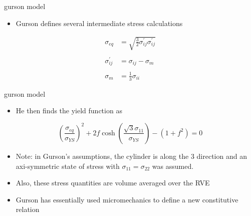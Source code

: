 \documentclass[
  letterpaper,
  ignorenonframetext,
  aspectratio=43,
  handout,
  12pt]{beamer}
\providecommand{\tightlist}{%
  \setlength{\itemsep}{0pt}\setlength{\parskip}{0pt}}
\providecommand{\tightlist}{%
\setlength{\itemsep}{0pt}\setlength{\parskip}{0pt}}
\begin{document}
\begin{frame}{gurson model}
\protect\hypertarget{gurson-model-1}{}
\begin{itemize}
\tightlist
\item
  Gurson defines several intermediate stress calculations
\end{itemize}

\[\begin{aligned}
  \sigma_{eq} &= \sqrt{\frac{3}{2}\sigma_{ij}^\prime\sigma_{ij}^\prime}\\\\
  \sigma_{ij}^\prime &= \sigma_{ij} - \sigma_m\\\\
  \sigma_m &= \frac{1}{3} \sigma_{ii}
\end{aligned}\]
\end{frame}

\begin{frame}{gurson model}
\protect\hypertarget{gurson-model-2}{}
\begin{itemize}
\tightlist
\item
  He then finds the yield function as
\end{itemize}

\[\left(\frac{\sigma_{eq}}{\sigma_{YS}}\right)^2 + 2f\cosh\left( \frac{\sqrt{3}\sigma_{11}}{\sigma_{YS}}\right) - (1+f^2) = 0\]

\begin{itemize}
\tightlist
\item
  Note: in Gurson's assumptions, the cylinder is along the 3 direction
  and an axi-symmetric state of stress with
  \(\sigma_{11} = \sigma_{22}\) was assumed.
\item
  Also, these stress quantities are volume averaged over the RVE
\item
  Gurson has essentially used micromechanics to define a new
  constitutive relation
\end{itemize}
\end{frame}
\end{document}

